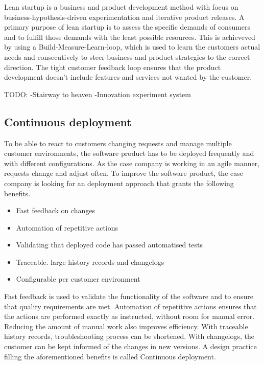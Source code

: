 \documentclass[english]{tktltiki2}
\theoremstyle{definition}
\theoremstyle{remark}
\begin{document}
Lean startup \cite{ries2011lean} is a business and product development method with focus on business-hypothesis-driven experimentation and iterative product releases. A primary purpose of lean startup is to assess the specific demands of consumers and to fulfill those demands with the least possible resources. This is achieveved by using a Build-Measure-Learn-loop, which is used to learn the customers actual needs and consecutively to steer business and product strategies to the correct direction. The tight customer feedback loop ensures that the product development doesn't include features and services not wanted by the customer. 

TODO:
-Stairway to heaven
-Innovation experiment system

\subsection{Continuous deployment}

To be able to react to customers changing requests and manage multiple customer environments, the software product has to be deployed frequently and with different configurations. As the case company is working in an agile manner, requests change and adjust often. To improve the software product, the case company is looking for an deployment approach that grants the following benefits.

\begin{itemize}
\item  Fast feedback on changes
\item  Automation of repetitive actions
\item  Validating that deployed code has passed automatised tests 
\item  Traceable. large history records and changelogs
\item  Configurable per customer environment
\end{itemize}

Fast feedback is used to validate the functionality of the software and to ensure that quality requirements are met. Automation of repetitive actions ensures that the actions are performed exactly as instructed, without room for manual error. Reducing the amount of manual work also improves efficiency. With traceable history records, troubleshooting process can be shortened. With changelogs, the customer can be kept informed of the changes in new versions. A design practice filling the aforementioned benefits is called Continuous deployment.
\end{document}
